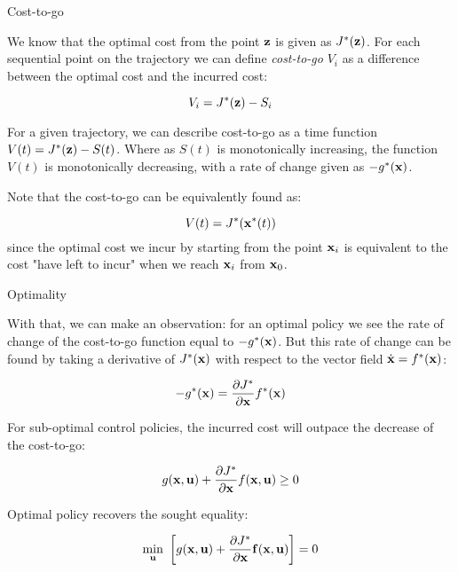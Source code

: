 \documentclass{beamer}
\begin{document}
\begin{frame}{Cost-to-go}
	\begin{flushleft}
		
		We know that the optimal cost from the point $\mathbf{z}$ is given as $J^*(\mathbf{z})$. For each sequential point on the trajectory we can define \emph{cost-to-go} $V_i$ as a difference between the optimal cost and the incurred cost:
		
		\begin{equation}
			V_i = J^*(\mathbf{z}) - S_i
		\end{equation}
		
		For a given trajectory, we can describe cost-to-go as a time function $V(t) = J^*(\mathbf{z}) - S(t)$. Where as $S(t)$ is monotonically increasing, the function $V(t)$ is monotonically decreasing, with a rate of change given as $-g^*(\mathbf{x})$.
		
		\bigskip
		
		Note that the cost-to-go can be equivalently found as:
		
		\begin{equation}
			V(t) = J^*(\mathbf{x}^*(t))
		\end{equation}
		since the optimal cost we incur by starting from the point $\mathbf{x}_i$ is equivalent to the cost "have left to incur" when we reach $\mathbf{x}_i$ from $\mathbf{x}_0$.
		
	\end{flushleft}
\end{frame}


\begin{frame}{Optimality}
	\begin{flushleft}
		
		With that, we can make an observation: for an optimal policy we see the rate of change of the cost-to-go function equal to $-g^*(\mathbf{x})$. But this rate of change can be found by taking a derivative of $J^*(\mathbf{x})$ with respect to the vector field $\dot{\mathbf{x}} = f^*(\mathbf{x})$:
		
		\begin{equation}
			-g^*(\mathbf{x}) = \frac{\partial J^*}{\partial \mathbf{x}} f^*(\mathbf{x})
		\end{equation}
		
		For sub-optimal control policies, the incurred cost will outpace the decrease of the cost-to-go:
		
		\begin{equation}
			g(\mathbf{x}, \mathbf{u}) + \frac{\partial J^*}{\partial \mathbf{x}} f(\mathbf{x}, \mathbf{u}) \geq 0
		\end{equation}
		
		Optimal policy recovers the sought equality:
		
		\begin{equation}
			\underset{\bo{u}}{\min} \ 
			\left[ 
			g(\bo{x}, \bo{u}) + 
			\frac{\partial J^*}{\partial \bo{x}} \bo{f} (\bo{x}, \bo{u}) 
			\right] = 0
		\end{equation}
		
	\end{flushleft}
\end{frame}
\end{document}
